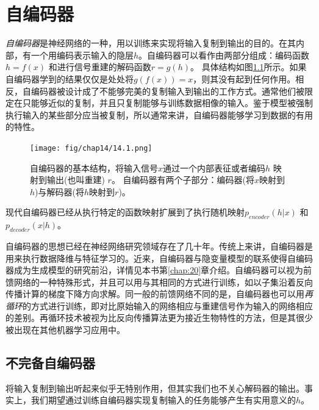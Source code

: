 
\chapter{自编码器}
\label{chap:14}

\emph{自编码器}是神经网络的一种，用以训练来实现将输入复制到输出的目的。在其内部，有一个用编码表示输入的隐层$h$。自编码器可以看作由两部分组成：编码函数$h = f(x)$ 和进行信号重建的解码函数$r = g(h)$。 具体结构如图\ref{fig:14.1}所示。如果自编码器学到的结果仅仅是处处将$g(f(x)) = x$，则其没有起到任何作用。相反，自编码器被设计成了不能够完美的复制输入到输出的工作方式。通常他们被限定在只能够近似的复制，并且只复制能够与训练数据相像的输入。鉴于模型被强制执行输入的某些部分应当被复制，所以通常来讲，自编码器能够学习到数据的有用的特性。


\begin{figure}[htbp] %
   \centering
   \texttt{[image: fig/chap14/14.1.png]} 
   \caption{自编码器的基本结构，将输入信号$x$通过一个内部表征或者编码$h$ 映射到输出(也叫重建) $r$。 自编码器有两个子部分：编码器(将$x$映射到$h$)与解码器(将$h$映射到$r$)。}
   \label{fig:14.1}
\end{figure}

现代自编码器已经从执行特定的函数映射扩展到了执行随机映射$p_{encoder}(h|x)$ 和 $p_{decoder}(x|h)$。

自编码器的思想已经在神经网络研究领域存在了几十年。传统上来讲，自编码器是用来执行数据降维与特征学习的。近来，自编码器与隐变量模型的联系使得自编码器成为生成模型的研究前沿，详情见本书第\ref{chap:20}章介绍。自编码器可以视为前馈网络的一种特殊形式，并且可以用与其相同的方式进行训练，如以子集沿着反向传播计算的梯度下降方向求解。同一般的前馈网络不同的是，自编码器也可以用\emph{再循环}的方式进行训练，即对比原始输入的网络相应与重建信号作为输入的网络相应的差别。再循环技术被视为比反向传播算法更为接近生物特性的方法，但是其很少被出现在其他机器学习应用中。

\section{不完备自编码器}
将输入复制到输出听起来似乎无特别作用，但其实我们也不关心解码器的输出。事实上，我们期望通过训练自编码器实现复制输入的任务能够产生有实用意义的$h$。

